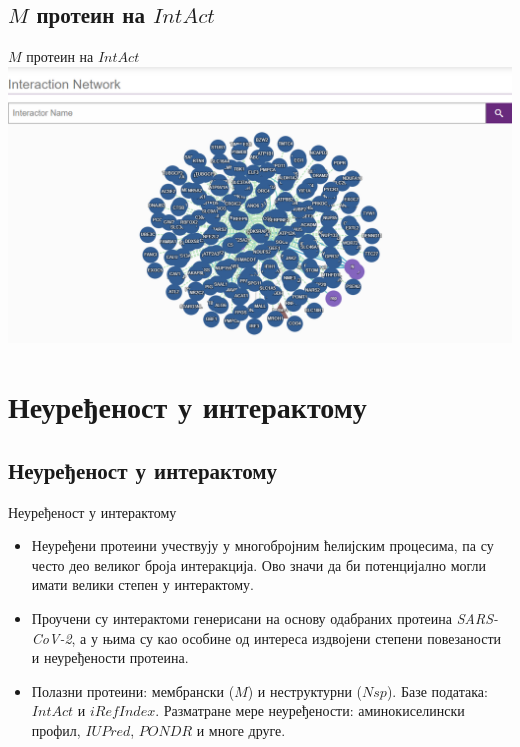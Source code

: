\documentclass[hyperref={bookmarks=false}]{beamer}
\begin{document}
\subsection{$M$ протеин на $IntAct$}
\begin{frame}{$M$ протеин на $IntAct$}
\centering\includegraphics[width=\textwidth]{IntAct.png}
\end{frame}

\section{Неуређеност у интерактому}
\subsection{Неуређеност у интерактому}
\begin{frame}{Неуређеност у интерактому}
\begin{itemize}
	\item Неуређени протеини учествују у многобројним ћелијским процесима, па су често део великог броја интеракција. Ово значи да би потенцијално могли имати велики степен у интерактому.

	\item Проучени су интерактоми генерисани на основу одабраних протеина \textit{SARS-CoV-2}, а у њима су као особине од интереса издвојени степени повезаности и неуређености протеина.

	\item Полазни протеини: мембрански ($M$) и неструктурни ($Nsp$). Базе података: $IntAct$ и $iRefIndex$. Разматране мере неуређености: аминокиселински профил, $IUPred$, $PONDR$ и многе друге.
\end{itemize}
\end{frame}
\end{document}
